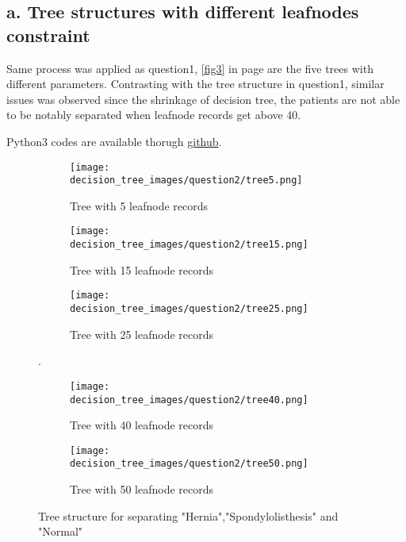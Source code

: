 \documentclass{article}
\begin{document}
\subsection*{a. Tree structures with different leafnodes constraint}
Same process was applied as question1, \autoref{fig3} in page \pageref{fig3} are the five trees with different parameters. Contrasting with the tree structure in question1, similar issues was observed since the shrinkage of decision tree, the patients are not able to be notably separated when leafnode records get above 40.

Python3 codes are available thorugh \href{https://github.com/frankligy/exercise_codes/blob/master/decision_tree_copy2.py}{github}.


\begin{figure}[h]
    \centering
    \begin{subfigure}[h]{.45\linewidth}
    \texttt{[image: decision\_tree\_images/question2/tree5.png]}
    \caption{Tree with 5 leafnode records}
    \label{q2_tree5}
    \end{subfigure}
    
    \begin{subfigure}[h]{.45\linewidth}
    \texttt{[image: decision\_tree\_images/question2/tree15.png]}
    \caption{Tree with 15 leafnode records}
    \label{q2_tree15}
    \end{subfigure}
    \begin{subfigure}[h]{.45\linewidth}
    \texttt{[image: decision\_tree\_images/question2/tree25.png]}
    \caption{Tree with 25 leafnode records}
    \label{q2_tree25}
    \end{subfigure}. %
    
    \begin{subfigure}[h]{.45\linewidth}
    \texttt{[image: decision\_tree\_images/question2/tree40.png]}
    \caption{Tree with 40 leafnode records}
    \label{q2_tree40}
    \end{subfigure}
    \begin{subfigure}[h]{.45\linewidth}
    \texttt{[image: decision\_tree\_images/question2/tree50.png]}
    \caption{Tree with 50 leafnode records}
    \label{q2_tree50}
    \end{subfigure} 
    
    \caption{Tree structure for separating "Hernia","Spondylolisthesis" and "Normal"}
    \label{fig3}
\end{figure}
\end{document}
